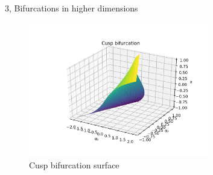 \documentclass[10pt,a4paper]{article}
\begin{document}
\begin{task}{3, Bifurcations in higher dimensions}
\begin{figure}[H]
    \centering
    \includegraphics[width=0.7\textwidth]{../plots/Figure_0.png}
    \caption{Cusp bifurcation surface}
    \label{fig:task3_cusp}
\end{figure}
\end{task}
\end{document}
